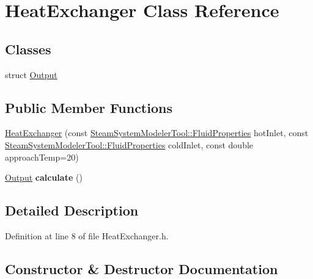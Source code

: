 \hypertarget{class_heat_exchanger}{}\section{Heat\+Exchanger Class Reference}
\label{class_heat_exchanger}
\subsection*{Classes}
\begin{DoxyCompactItemize}
\item 
struct \hyperlink{struct_heat_exchanger_1_1_output}{Output}
\end{DoxyCompactItemize}
\subsection*{Public Member Functions}
\begin{DoxyCompactItemize}
\item 
\hyperlink{class_heat_exchanger_adc897b215af3e2759c78edb2ef0b6bf9}{Heat\+Exchanger} (const \hyperlink{struct_steam_system_modeler_tool_1_1_fluid_properties}{Steam\+System\+Modeler\+Tool\+::\+Fluid\+Properties} hot\+Inlet, const \hyperlink{struct_steam_system_modeler_tool_1_1_fluid_properties}{Steam\+System\+Modeler\+Tool\+::\+Fluid\+Properties} cold\+Inlet, const double approach\+Temp=20)
\item 
\mbox{\label{class_heat_exchanger_a9322c6d0f9a33866e35157203eaf0ec6}} 
\hyperlink{struct_heat_exchanger_1_1_output}{Output} {\bfseries calculate} ()
\end{DoxyCompactItemize}


\subsection{Detailed Description}


Definition at line 8 of file Heat\+Exchanger.\+h.



\subsection{Constructor \& Destructor Documentation}
\mbox{\label{class_heat_exchanger_adc897b215af3e2759c78edb2ef0b6bf9}} 
